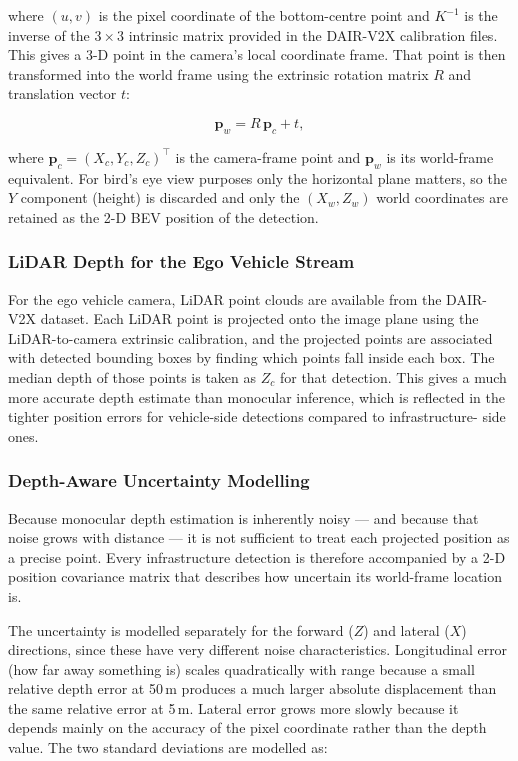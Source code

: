 \documentclass[12pt]{article}
\begin{document}
\noindent where $(u, v)$ is the pixel coordinate of the bottom-centre
point and $K^{-1}$ is the inverse of the $3{\times}3$ intrinsic matrix
provided in the DAIR-V2X calibration files. This gives a 3-D point in
the camera's local coordinate frame. That point is then transformed into
the world frame using the extrinsic rotation matrix $R$ and translation
vector $t$:
 
\begin{equation}
    \mathbf{p}_w = R\,\mathbf{p}_c + t,
    \label{eq:extrinsic}
\end{equation}
 
\noindent where $\mathbf{p}_c = (X_c, Y_c, Z_c)^\top$ is the
camera-frame point and $\mathbf{p}_w$ is its world-frame equivalent.
For bird's eye view purposes only the horizontal plane matters, so the
$Y$ component (height) is discarded and only the $(X_w, Z_w)$ world
coordinates are retained as the 2-D BEV position of the detection.
 
\subsubsection*{LiDAR Depth for the Ego Vehicle Stream}
 
For the ego vehicle camera, LiDAR point clouds are available from the
DAIR-V2X dataset. Each LiDAR point is projected onto the image plane
using the LiDAR-to-camera extrinsic calibration, and the projected
points are associated with detected bounding boxes by finding which
points fall inside each box. The median depth of those points is taken
as $Z_c$ for that detection. This gives a much more accurate depth
estimate than monocular inference, which is reflected in the tighter
position errors for vehicle-side detections compared to infrastructure-
side ones.
 
\subsubsection*{Depth-Aware Uncertainty Modelling}
 
Because monocular depth estimation is inherently noisy --- and because
that noise grows with distance --- it is not sufficient to treat each
projected position as a precise point. Every infrastructure detection is
therefore accompanied by a 2-D position covariance matrix that describes
how uncertain its world-frame location is.
 
\medskip
The uncertainty is modelled separately for the forward ($Z$) and lateral
($X$) directions, since these have very different noise characteristics.
Longitudinal error (how far away something is) scales quadratically with
range because a small relative depth error at 50\,m produces a much
larger absolute displacement than the same relative error at 5\,m.
Lateral error grows more slowly because it depends mainly on the
accuracy of the pixel coordinate rather than the depth value. The two
standard deviations are modelled as:
 
\end{document}
